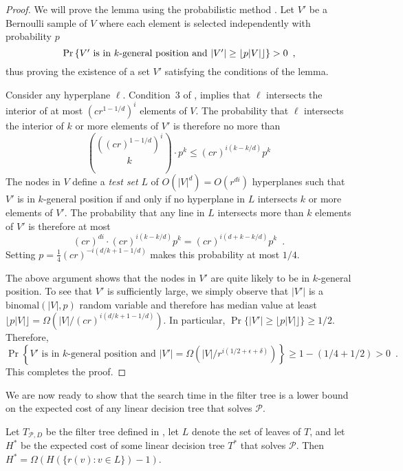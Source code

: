 \documentclass{patmorin}
\begin{document}
\begin{proof}
  We will prove the lemma using the probabilistic method \cite{as08}.
  Let $V'$ be a Bernoulli sample of $V$ where each element is selected
  independently with probability $p$
  \[
     \Pr\left\{
        \mbox{$V'$ is in $k$-general position 
          and $|V'| \ge {\left\lfloor p|V| \right\rfloor}$}
      \right\} > 0 \enspace ,
  \]
  thus proving the existence of a set $V'$ satisfying the conditions of
  the lemma.

  Consider any hyperplane $\ell$. Condition~3 of
  , implies that $\ell$ intersects the
  interior of at most $(cr^{1-1/d})^{i}$ elements of $V$.
  The probability that $\ell$ intersects the interior of $k$ or more
  elements of $V'$ is therefore no more than
  \[
    \binom{((cr)^{1-1/d})^{i}}{k}\cdot p^k
    \le (cr)^{i(k-k/d)}p^k
  \]
  The nodes in $V$ define a \emph{test set} $L$ of $O(|V|^d)=O(r^{di})$
  hyperplanes such that $V'$ is in $k$-general position if and only
  if no hyperplane in $L$ intersects $k$ or more elements of $V'$. The
  probability that any line in $L$ intersects more than $k$ elements of
  $V'$ is therefore at most
  \[
    (cr)^{di}\cdot(cr)^{i(k-k/d)}p^k = (cr)^{i(d+k-k/d)}p^k \enspace .
  \]
  Setting $p=\frac{1}{4}(cr)^{-i(d/k+1-1/d)}$ makes this probability
at most $1/4$.

  The above argument shows that the nodes in $V'$ are quite likely to
  be in $k$-general position. To see that $V'$ is sufficiently large,
  we simply observe that $|V'|$ is a $\mathrm{binomal}(|V|,p)$
  random variable and therefore has median value at least
  $\lfloor{p|V|}\rfloor=\Omega(|V|/(cr)^{i(d/k+1-1/d)})$.  In particular,
  $\Pr\{|V'|\ge \lfloor{p|V|}\rfloor\}\ge 1/2$.  Therefore,
  \[
     \Pr\left\{
        \mbox{$V'$ is in $k$-general position 
          and $|V'|=\Omega(|V|/r^{i(1/2+\epsilon+\delta)})$}
      \right\} \ge 1- (1/4 + 1/2) > 0 \enspace .
  \]
  This completes the proof.
\end{proof}

We are now ready to show that the search time in the filter tree
is a lower bound on the expected cost of any linear decision tree that
solves $\mathcal{P}$.

\begin{lem}
  Let $T_{\mathcal{P},D}$ be the filter tree defined in
  , let $L$ denote the set of leaves of $T$,
  and let $H^*$ be the expected cost of some linear decision tree $T^*$
  that solves $\mathcal{P}$.  Then $H^* = \Omega(H(\{r(v):v\in L\})-1)$.
\end{lem}
\end{document}
